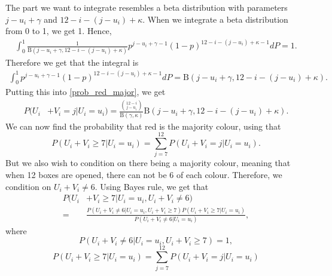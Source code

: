 \documentclass{article}
\begin{document}
\newpage
The part we want to integrate resembles a beta distribution with parameters $j-u_i+\gamma$ and $12-i-(j-u_i)+\kappa$. When we integrate a beta distribution from 0 to 1, we get 1. Hence,
\begin{equation*}
    \begin{aligned}
        \int_0^1 \frac{1}{\text{B}(j-u_i+\gamma,12-i-(j-u_i)+\kappa)}
        p^{j-u_i+\gamma-1} (1-p)^{12-i-(j-u_i)+\kappa-1} dP = 1.
    \end{aligned}
\end{equation*}
Therefore we get that the integral is 
\begin{equation*}
    \begin{aligned}
        \int_0^1 
        p^{j-u_i+\gamma-1} (1-p)^{12-i-(j-u_i)+\kappa-1} dP = \text{B}(j-u_i+\gamma,12-i-(j-u_i)+\kappa).
    \end{aligned}
\end{equation*}
Putting this into \eqref{prob_red_major}, we get
\begin{equation}
    \begin{aligned}
         P(U_i&+V_i = j | U_i=u_i)
         = \frac{\binom{12-i}{j-u_i}}{\text{B}(\gamma,\kappa)}  \text{B}(j-u_i+\gamma,12-i-(j-u_i)+\kappa) .
    \end{aligned}
\end{equation}
We can now find the probability that red is the majority colour, using that
\begin{equation*}
    P(U_i+V_i \geq 7 | U_i=u_i) = \sum_{j=7}^{12} P(U_i+V_i=j|U_i=u_i).
\end{equation*}
But we also wish to condition on there being a majority colour, meaning that when 12 boxes are opened, there can not be 6 of each colour. Therefore, we condition on $U_i+V_i \neq 6$. Using Bayes rule, we get that
\begin{equation*}
    \begin{aligned}
         P(U_i&+V_i \geq 7 | U_i=u_i, U_i+V_i \neq 6) \\[6pt]
         = &\frac{P(U_i+V_i \neq 6|U_i=u_i,U_i+V_i \geq 7)P(U_i+V_i \geq 7|U_i=u_i)}{P(U_i+V_i \neq 6|U_i=u_i)},
    \end{aligned}
\end{equation*}
where 
\begin{equation*}
    P(U_i+V_i \neq 6|U_i=u_i,U_i+V_i \geq 7) = 1,
\end{equation*}
\begin{equation*}
    P(U_i+V_i \geq 7|U_i=u_i) = \sum_{j=7}^{12} P(U_i+V_i=j|U_i=u_i)
\end{equation*}
\end{document}
